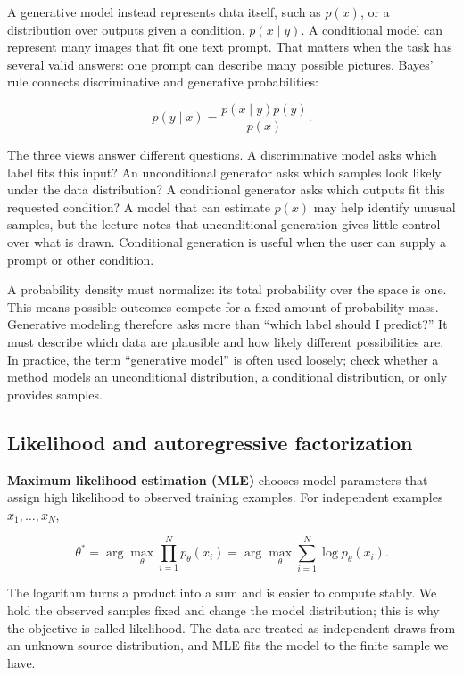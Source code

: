 A generative model instead represents data itself, such as \(p(x)\), or a distribution over outputs given a condition, \(p(x\mid y)\). A conditional model can represent many images that fit one text prompt. That matters when the task has several valid answers: one prompt can describe many possible pictures. Bayes' rule connects discriminative and generative probabilities:

\[
p(y\mid x)=\frac{p(x\mid y)p(y)}{p(x)}.
\]

The three views answer different questions. A discriminative model asks which label fits this input? An unconditional generator asks which samples look likely under the data distribution? A conditional generator asks which outputs fit this requested condition? A model that can estimate \(p(x)\) may help identify unusual samples, but the lecture notes that unconditional generation gives little control over what is drawn. Conditional generation is useful when the user can supply a prompt or other condition.

A probability density must normalize: its total probability over the space is one. This means possible outcomes compete for a fixed amount of probability mass. Generative modeling therefore asks more than ``which label should I predict?'' It must describe which data are plausible and how likely different possibilities are. In practice, the term ``generative model'' is often used loosely; check whether a method models an unconditional distribution, a conditional distribution, or only provides samples.

\subsection{Likelihood and autoregressive factorization}\label{04-visual-computing-ii-ch031-likelihood-and-autoregressive-factorization}

\hypertarget{04-visual-computing-ii-ch031-likelihood-and-autoregressive-factorization}{}

\textbf{Maximum likelihood estimation (MLE)} chooses model parameters that assign high likelihood to observed training examples. For independent examples \(x_1,\ldots,x_N\),

\[
\theta^*=\arg\max_\theta \prod_{i=1}^{N}p_\theta(x_i)
=\arg\max_\theta \sum_{i=1}^{N}\log p_\theta(x_i).
\]

The logarithm turns a product into a sum and is easier to compute stably. We hold the observed samples fixed and change the model distribution; this is why the objective is called likelihood. The data are treated as independent draws from an unknown source distribution, and MLE fits the model to the finite sample we have.

